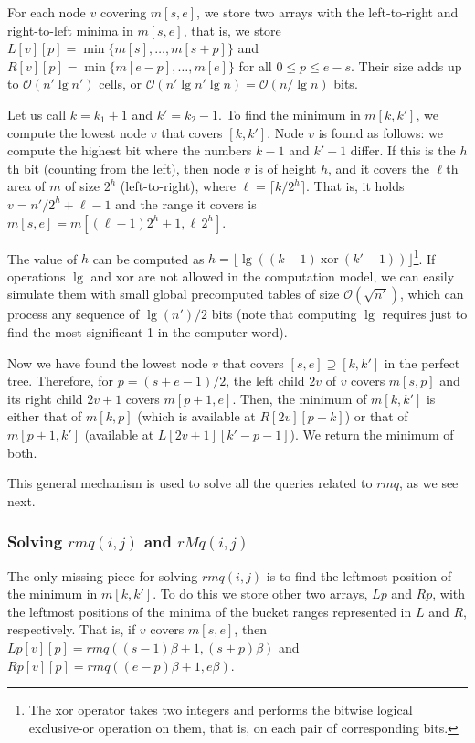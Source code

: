 \documentclass[11pt]{article}
\renewcommand{\log}{\lg}
\newcommand{\0}{\mathit{0}}
\newcommand{\1}{\mathit{1}}
\newcommand{\rmq}{\mathit{rmq}}
\newcommand{\rMq}{\mathit{rMq}}
\newcommand{\Oh}[1]{\mathcal{O}\!\left(#1\right)}
\begin{document}
For each node $v$ covering $m[s,e]$, we store two arrays with the
left-to-right and right-to-left minima in $m[s,e]$, that is, we store
$L[v][p]=\min \{ m[s],\ldots,m[s+p] \}$ and
$R[v][p]=\min \{ m[e-p],\ldots,m[e] \}$ for all $0 \le p \le e-s$.
Their size adds up to $\Oh{n'\log n'}$ cells, or
$\Oh{n'\log n'\log n}=\Oh{n/\log n}$ bits.

Let us call $k=k_1+1$ and $k'=k_2-1$. To find the minimum in $m[k,k']$, we 
compute the lowest node $v$ that covers $[k,k']$. Node $v$ is found as follows:
we compute the highest bit where the numbers $k-1$ and $k'-1$ differ. If this is
the $h$th bit (counting from the left), then node $v$ is of height $h$, and it 
covers the $\ell$th area of $m$ of size $2^h$ (left-to-right), where
$\ell=\lceil k/2^h\rceil$. That is, it holds $v = n'/2^h+\ell-1$ and the range
it covers is $m[s,e] = m[(\ell-1)2^h+1,\ell\, 2^h]$.

The value of $h$ can be computed as $h=\lfloor \log
((k-1)~\mathrm{xor}~(k'-1))\rfloor$\footnote{The $\mathrm{xor}$ operator
        takes two integers and performs the bitwise logical exclusive-or 
operation on them, that is, on each pair of corresponding bits.}. 
If operations $\log$ and $\mathrm{xor}$ are not allowed in the computation model, we can
easily simulate them with small global precomputed tables of size 
$\Oh{\sqrt{n'}}$, 
which can process any sequence of $\log(n')/2$ bits (note that computing $\log$
requires just to find the most significant 1 in the computer word).

Now we have found the lowest node $v$ that covers $[s,e] \supseteq [k,k']$ in
the perfect tree. Therefore, for $p=(s+e-1)/2$, the left child $2v$ of $v$
covers $m[s,p]$ and its right child $2v+1$ covers $m[p+1,e]$. Then, the minimum
of $m[k,k']$ is either that of $m[k,p]$ (which is available at $R[2v][p-k]$) or
that of $m[p+1,k']$ (available at $L[2v+1][k'-p-1]$). We return the minimum of
both. 

This general mechanism is used to solve all the queries related to $\rmq$,
as we see next.

\subsubsection{Solving $\rmq(i,j)$ and $\rMq(i,j)$} \label{sec:rmq}

The only missing piece for solving $\rmq(i,j)$ is to find the leftmost 
position of the minimum in $m[k,k']$. To do this we store other two arrays,
$Lp$ and $Rp$, with the leftmost positions of the minima of the bucket ranges
represented in $L$ and $R$, respectively. That is, if $v$ covers $m[s,e]$, then
$Lp[v][p] = \rmq((s-1)\beta+1,(s+p)\beta)$ and
$Rp[v][p] = \rmq((e-p)\beta+1,e\beta)$.
\end{document}
